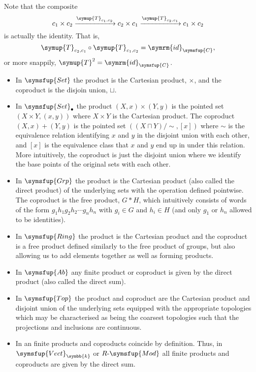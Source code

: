 \documentclass[fleqn]{NotesClass}
\makeatletter
\newcommand{\cat}[1]{\symsfup{#1}}
\newcommand{\c@egory}[1]{\symsfup{#1}}
\newcommand{\Set}{\c@egory{Set}}
\newcommand{\SetPt}{\c@egory{Set}_{\bullet}}
\newcommand{\Grp}{\c@egory{Grp}}
\newcommand{\Ab}{\c@egory{Ab}}
\newcommand{\Ring}{\c@egory{Ring}}
\newcommand{\Vect}[1][\field]{\c@egory{Vect}_{#1}}
\newcommand{\RMod}[1][R]{#1\text{-}\c@egory{Mod}}
\newcommand{\Top}{\c@egory{Top}}
\newcommand{\switch}{\symup{T}}
\newcommand{\id}{\symrm{id}}
\renewcommand{\field}{\symbb{k}}
\makeatother
\begin{document}
    Note that the composite
    \begin{equation}
        c_1 \times c_2 \xrightarrow{\switch_{c_1,c_2}} c_2 \times c_1 \xrightarrow{\switch_{c_2,c_1}} c_1 \times c_2
    \end{equation}
    is actually the identity.
    That is,
    \begin{equation}
        \switch_{c_2, c_1} \circ \switch_{c_1,c_2} = \id_{\cat{C}},
    \end{equation}
    or more snappily, \(\switch^2 = \id_{\cat{C}}\).
    
    \begin{exm}{}{}
        \begin{itemize}
            \item In \(\Set\) the product is the Cartesian product, \(\times\), and the coproduct is the disjoin union, \(\sqcup\).
            \item In \(\SetPt\) the product \((X, x) \times (Y, y)\) is the pointed set \((X \times Y, (x, y))\) where \(X \times Y\) is the Cartesian product.
            The coproduct \((X, x) + (Y, y)\) is the pointed set \(((X \sqcap Y)/{\sim}, [x])\) where \(\sim\) is the equivalence relation identifying \(x\) and \(y\) in the disjoint union with each other, and \([x]\) is the equivalence class that \(x\) and \(y\) end up in under this relation.
            More intuitively, the coproduct is just the disjoint union where we identify the base points of the original sets with each other.
            \item In \(\Grp\) the product is the Cartesian product (also called the direct product) of the underlying sets with the operation defined pointwise.
            The coproduct is the free product, \(G * H\), which intuitively consists of words of the form \(g_1h_1g_2h_2 \dotsm g_nh_n\) with \(g_i \in G\) and \(h_i \in H\) (and only \(g_1\) or \(h_n\) allowed to be identities).
            \item In \(\Ring\) the product is the Cartesian product and the coproduct is a free product defined similarly to the free product of groups, but also allowing us to add elements together as well as forming products.
            \item In \(\Ab\) any finite product or coproduct is given by the direct product (also called the direct sum).
            \item In \(\Top\) the product and coproduct are the Cartesian product and disjoint union of the underlying sets equipped with the appropriate topologies which may be characterised as being the coarsest topologies such that the projections and inclusions are continuous.
            \item In an  finite products and coproducts coincide by definition.
            Thus, in \(\Vect\) or \(\RMod\) all finite products and coproducts are given by the direct sum.
        \end{itemize}
    \end{exm}
    
\end{document}
